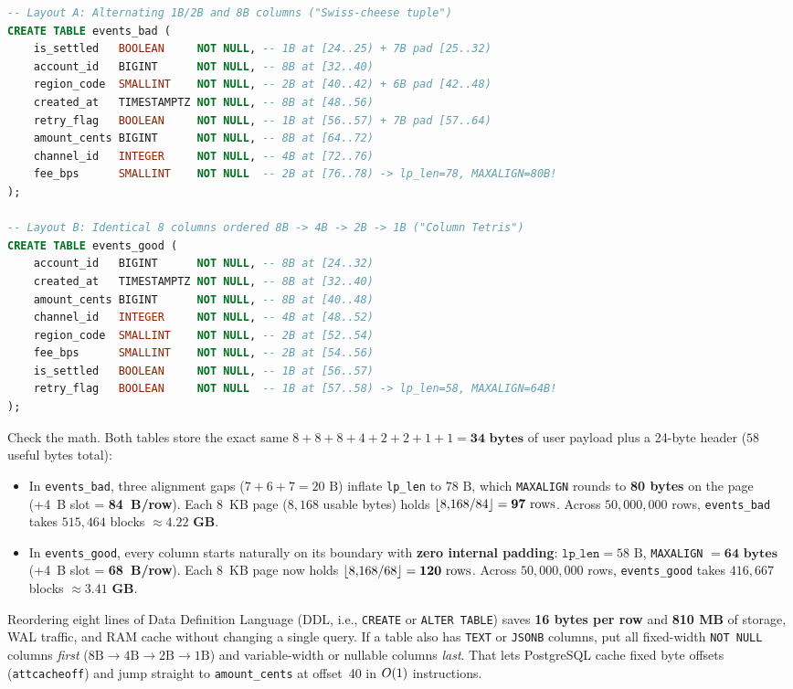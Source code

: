 \begin{lstlisting}[language=SQL]
-- Layout A: Alternating 1B/2B and 8B columns ("Swiss-cheese tuple")
CREATE TABLE events_bad (
    is_settled   BOOLEAN     NOT NULL, -- 1B at [24..25) + 7B pad [25..32)
    account_id   BIGINT      NOT NULL, -- 8B at [32..40)
    region_code  SMALLINT    NOT NULL, -- 2B at [40..42) + 6B pad [42..48)
    created_at   TIMESTAMPTZ NOT NULL, -- 8B at [48..56)
    retry_flag   BOOLEAN     NOT NULL, -- 1B at [56..57) + 7B pad [57..64)
    amount_cents BIGINT      NOT NULL, -- 8B at [64..72)
    channel_id   INTEGER     NOT NULL, -- 4B at [72..76)
    fee_bps      SMALLINT    NOT NULL  -- 2B at [76..78) -> lp_len=78, MAXALIGN=80B!
);

-- Layout B: Identical 8 columns ordered 8B -> 4B -> 2B -> 1B ("Column Tetris")
CREATE TABLE events_good (
    account_id   BIGINT      NOT NULL, -- 8B at [24..32)
    created_at   TIMESTAMPTZ NOT NULL, -- 8B at [32..40)
    amount_cents BIGINT      NOT NULL, -- 8B at [40..48)
    channel_id   INTEGER     NOT NULL, -- 4B at [48..52)
    region_code  SMALLINT    NOT NULL, -- 2B at [52..54)
    fee_bps      SMALLINT    NOT NULL, -- 2B at [54..56)
    is_settled   BOOLEAN     NOT NULL, -- 1B at [56..57)
    retry_flag   BOOLEAN     NOT NULL  -- 1B at [57..58) -> lp_len=58, MAXALIGN=64B!
);
\end{lstlisting}

Check the math. Both tables store the exact same $8 + 8 + 8 + 4 + 2 + 2 + 1 + 1 = \mathbf{34\text{ bytes}}$ of user payload plus a 24-byte header ($58$ useful bytes total):
\begin{itemize}
  \item In \texttt{events\_bad}, three alignment gaps ($7 + 6 + 7 = 20\text{ B}$) inflate \texttt{lp\_len} to $78\text{ B}$, which \texttt{MAXALIGN} rounds to \textbf{80 bytes} on the page (+4~B slot = \textbf{84~B/row}). Each 8~KB page ($8{,}168$ usable bytes) holds $\lfloor8{,}168 / 84\rfloor = \mathbf{97\text{ rows}}$. Across $50{,}000{,}000$ rows, \texttt{events\_bad} takes $515{,}464$ blocks $\approx \mathbf{4.22\text{ GB}}$.
  \item In \texttt{events\_good}, every column starts naturally on its boundary with \textbf{zero internal padding}: $\texttt{lp\_len} = 58\text{ B}$, \texttt{MAXALIGN} $= \mathbf{64\text{ bytes}}$ (+4~B slot = \textbf{68~B/row}). Each 8~KB page now holds $\lfloor8{,}168 / 68\rfloor = \mathbf{120\text{ rows}}$. Across $50{,}000{,}000$ rows, \texttt{events\_good} takes $416{,}667$ blocks $\approx \mathbf{3.41\text{ GB}}$.
\end{itemize}
Reordering eight lines of Data Definition Language (DDL, i.e., \texttt{CREATE} or \texttt{ALTER TABLE}) saves \textbf{16 bytes per row} and \textbf{810 MB} of storage, WAL traffic, and RAM cache without changing a single query. If a table also has \texttt{TEXT} or \texttt{JSONB} columns, put all fixed-width \texttt{NOT NULL} columns \emph{first} ($8\text{B} \to 4\text{B} \to 2\text{B} \to 1\text{B}$) and variable-width or nullable columns \emph{last}. That lets PostgreSQL cache fixed byte offsets (\texttt{attcacheoff}) and jump straight to \texttt{amount\_cents} at offset~40 in $O(1)$ instructions.

